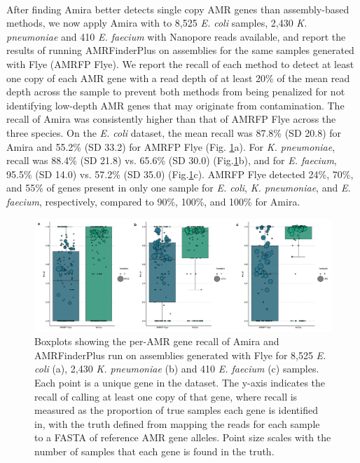 \paragraph{}
After finding Amira better detects single copy AMR genes than assembly-based methods, we now apply Amira with to 8,525 \textit{E. coli} samples, 2,430 \textit{K. pneumoniae} and 410 \textit{E. faecium} with Nanopore reads available, and report the results of running AMRFinderPlus on assemblies for the same samples generated with Flye (AMRFP Flye). We report the recall of each method to detect at least one copy of each AMR gene with a read depth of at least 20\% of the mean read depth across the sample to prevent both methods from being penalized for not identifying low-depth AMR genes that may originate from contamination. The recall of Amira was consistently higher than that of AMRFP Flye across the three species. On the \textit{E. coli} dataset, the mean recall was 87.8\% (SD 20.8) for Amira and 55.2\% (SD 33.2) for AMRFP Flye (Fig. \ref{fig:5}a). For \textit{K. pneumoniae}, recall was 88.4\% (SD 21.8) vs. 65.6\% (SD 30.0) (Fig.\ref{fig:5}b), and for \textit{E. faecium}, 95.5\% (SD 14.0) vs. 57.2\% (SD 35.0) (Fig.\ref{fig:5}c). AMRFP Flye detected 24\%, 70\%, and 55\% of genes present in only one sample for \textit{E. coli}, \textit{K. pneumoniae}, and \textit{E. faecium}, respectively, compared to 90\%, 100\%, and 100\% for Amira.

\begin{figure}
\centering
\includegraphics[width=1\linewidth]{Figures/figure_5.pdf}
\caption{Boxplots showing the per-AMR gene recall of Amira and AMRFinderPlus run on assemblies generated with Flye for 8,525 \textit{E. coli} (a), 2,430 \textit{K. pneumoniae} (b) and 410 \textit{E. faecium} (c) samples. Each point is a unique gene in the dataset. The y-axis indicates the recall of calling at least one copy of that gene, where recall is measured as the proportion of true samples each gene is identified in, with the truth defined from mapping the reads for each sample to a FASTA of reference AMR gene alleles. Point size scales with the number of samples that each gene is found in the truth.}
\label{fig:5}
\end{figure}

